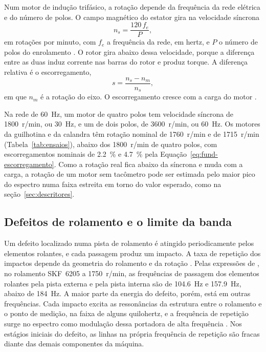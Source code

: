Num motor de indução trifásico, a rotação depende da frequência da rede elétrica e do número de polos. O campo magnético do estator gira na velocidade síncrona
\begin{equation}
n_s = \frac{120\, f_e}{P},
\label{eq:fund-sincrona}
\end{equation}
em rotações por minuto, com $f_e$ a frequência da rede, em hertz, e $P$ o número de polos do enrolamento \cite{chapman2012}. O rotor gira abaixo dessa velocidade, porque a diferença entre as duas induz corrente nas barras do rotor e produz torque. A diferença relativa é o escorregamento,
\begin{equation}
s = \frac{n_s - n_m}{n_s},
\label{eq:fund-escorregamento}
\end{equation}
em que $n_m$ é a rotação do eixo. O escorregamento cresce com a carga do motor \cite{chapman2012}.

Na rede de \SI{60}{\hertz}, um motor de quatro polos tem velocidade síncrona de \SI{1800}{r/min}, ou \SI{30}{\hertz}, e um de dois polos, de \SI{3600}{r/min}, ou \SI{60}{\hertz}. Os motores da guilhotina e da calandra têm rotação nominal de \SI{1760}{r/min} e de \SI{1715}{r/min} (Tabela~\ref{tab:ensaios}), abaixo dos \SI{1800}{r/min} de quatro polos, com escorregamentos nominais de \SI{2,2}{\percent} e \SI{4,7}{\percent} pela Equação~\eqref{eq:fund-escorregamento}. Como a rotação real fica abaixo da síncrona e muda com a carga, a rotação de um motor sem tacômetro pode ser estimada pelo maior pico do espectro numa faixa estreita em torno do valor esperado, como na seção~\ref{sec:descritores}.

\subsection{Defeitos de rolamento e o limite da banda}\label{sec:fund-rolamento}

Um defeito localizado numa pista de rolamento é atingido periodicamente pelos elementos rolantes, e cada passagem produz um impacto. A taxa de repetição dos impactos depende da geometria do rolamento e da rotação \cite{randall2011}. Pelas expressões de , no rolamento SKF~6205 a \SI{1750}{r/min}, as frequências de passagem dos elementos rolantes pela pista externa e pela pista interna são de \SI{104,6}{\hertz} e \SI{157,9}{\hertz}, abaixo de \SI{184}{\hertz}. A maior parte da energia do defeito, porém, está em outras frequências. Cada impacto excita as ressonâncias da estrutura entre o rolamento e o ponto de medição, na faixa de alguns quilohertz, e a frequência de repetição surge no espectro como modulação dessa portadora de alta frequência \cite{randall2011}. Nos estágios iniciais do defeito, as linhas na própria frequência de repetição são fracas diante das demais componentes da máquina.

